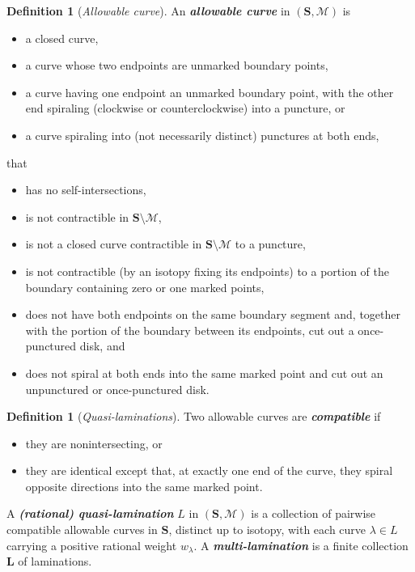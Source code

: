 \documentclass{amsart}
\theoremstyle{definition}
\newtheorem{definition}[proposition]{Definition}
\theoremstyle{remark}
\numberwithin{equation}{section}
\newcommand{\newword}[1]{\textbf{\emph{#1}}}
\newcommand{\0}{{\mathbf{0}}}
\newcommand{\M}{\mathcal{M}}
\renewcommand{\L}{\mathbf{L}}
\renewcommand{\S}{\mathbf{S}}
\begin{document}
\begin{definition}[\emph{Allowable curve}]\label{allowable def}
An \newword{allowable curve} in $(\S,\M)$ is  
\begin{itemize}
\item a closed curve,
\item a curve whose two endpoints are unmarked boundary points,
\item a curve having one endpoint an unmarked boundary point, with the other end spiraling (clockwise or counterclockwise) into a puncture, or
\item a curve spiraling into (not necessarily distinct) punctures at both ends,
\end{itemize}
that
\begin{itemize}
\item has no self-intersections,
\item is not contractible in $\S\setminus\M$,
\item is not a closed curve contractible in $\S\setminus\M$ to a puncture,
\item is not contractible (by an isotopy fixing its endpoints) to a portion of the boundary containing zero or one marked points,
\item does not have both endpoints on the same boundary segment and, together with the portion of the boundary between its endpoints, cut out a once-punctured disk, and 
\item does not spiral at both ends into the same marked point and cut out an unpunctured or once-punctured disk.
\end{itemize}
\end{definition}


\begin{definition}[\emph{Quasi-laminations}]\label{quasilam def}
Two allowable curves are \newword{compatible} if 
\begin{itemize}
\item
they are nonintersecting, or 
\item they are identical except that, at exactly one end of the curve, they spiral opposite directions into the same marked point.
\end{itemize}
A \newword{(rational) quasi-lamination} $L$ in $(\S,\M)$ is a collection of pairwise compatible allowable curves in $\S$, distinct up to isotopy, with each curve $\lambda\in L$ carrying a positive rational weight $w_\lambda$.
A \newword{multi-lamination} is a finite collection $\L$ of laminations.
\end{definition}
\end{document}
